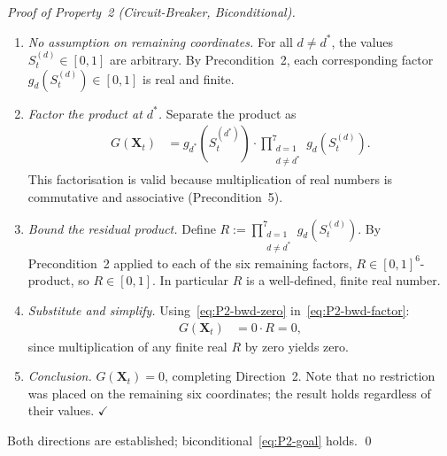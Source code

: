 \documentclass[12pt,openany]{book}
\numberwithin{equation}{chapter}
\theoremstyle{plain}
\theoremstyle{definition}
\theoremstyle{remark}
\def\mathcal#1{#1}%
\begin{document}
\begin{proof}[Proof of Property~2 (Circuit-Breaker, Biconditional)]
\begin{enumerate}
  \item \emph{No assumption on remaining coordinates.}
        For all $d\neq d^*$, the values
        $\mathcal{S}_t^{(d)}\in[0,1]$ are arbitrary.
        By Precondition~2, each corresponding factor
        $g_d\!\left(\mathcal{S}_t^{(d)}\right)\in[0,1]$
        is real and finite.

  \item \emph{Factor the product at $d^*$.}
        Separate the product as
        \begin{align}
          G(\mathbf{X}_t)
          &= g_{d^*}\!\left(\mathcal{S}_t^{(d^*)}\right)
             \cdot
             \prod_{\substack{d=1\\d \neq d^*}}^{7}
               g_d\!\left(\mathcal{S}_t^{(d)}\right).
          \label{eq:P2-bwd-factor}
        \end{align}
        This factorisation is valid because multiplication
        of real numbers is commutative and associative
        (Precondition~5).

  \item \emph{Bound the residual product.}
        Define
        $R :=
         \prod_{\substack{d=1\\d \neq d^*}}^{7}
           g_d\!\left(\mathcal{S}_t^{(d)}\right)$.
        By Precondition~2 applied to each of the six
        remaining factors, $R \in [0,1]^6$-product, so
        $R \in [0,1]$.  In particular $R$ is a
        well-defined, finite real number.

  \item \emph{Substitute and simplify.}
        Using~\eqref{eq:P2-bwd-zero}
        in~\eqref{eq:P2-bwd-factor}:
        \begin{align}
          G(\mathbf{X}_t)
          &= 0 \cdot R
           = 0,
          \label{eq:P2-bwd-result}
        \end{align}
        since multiplication of any finite real $R$ by zero
        yields zero.

  \item \emph{Conclusion.}
        $G(\mathbf{X}_t) = 0$, completing Direction~2.
        Note that no restriction was placed on the
        remaining six coordinates; the result holds
        regardless of their values. \hfill$\checkmark$
\end{enumerate}

\medskip\noindent
Both directions are established; biconditional~\eqref{eq:P2-goal}
holds. \qed
\end{proof}
\end{document}

